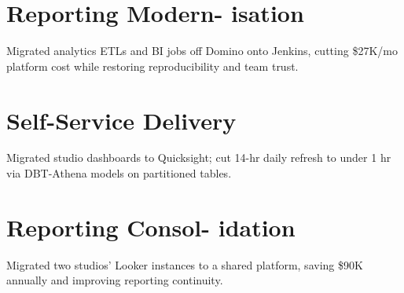 \section{\large \faGem Reporting Modern- isation}
Migrated analytics ETLs and BI jobs off Domino onto Jenkins, cutting \$27K/mo platform cost while restoring reproducibility and team trust.
%
\section{\large \faGem Self-Service Delivery}
Migrated studio dashboards to Quicksight; cut 14-hr daily refresh to under 1 hr via DBT-Athena models on partitioned tables.
%
\section{\large \faGem Reporting Consol- idation}
Migrated two studios' Looker instances to a shared platform, saving \$90K annually and improving reporting continuity.
